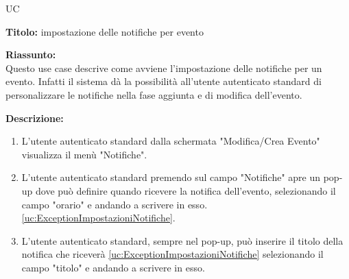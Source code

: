 \begin{listaPersonale}{UC}
    \newpage


    \begin{center}
        
    \end{center}

    \textbf{Titolo:} impostazione delle notifiche per evento

    \textbf{Riassunto:} \\
    Questo use case descrive come avviene l'impostazione delle notifiche per un evento. Infatti il sistema dà la possibilità all'utente autenticato standard di personalizzare le notifiche nella fase aggiunta e di modifica dell'evento.

    \textbf{Descrizione:}
    \begin{enumerate}
        \item L'utente autenticato standard dalla schermata "Modifica/Crea Evento" visualizza il menù "Notifiche".
        \item L'utente autenticato standard premendo sul campo "Notifiche" apre un pop-up dove può definire quando ricevere la notifica dell'evento, selezionando il campo "orario" e andando a scrivere in esso. \ref{uc:ExceptionImpostazioniNotifiche}.
        \item L'utente autenticato standard, sempre nel pop-up, può inserire il titolo della notifica che riceverà \ref{uc:ExceptionImpostazioniNotifiche} selezionando il campo "titolo" e andando a scrivere in esso.
    \end{enumerate}


\end{listaPersonale}
